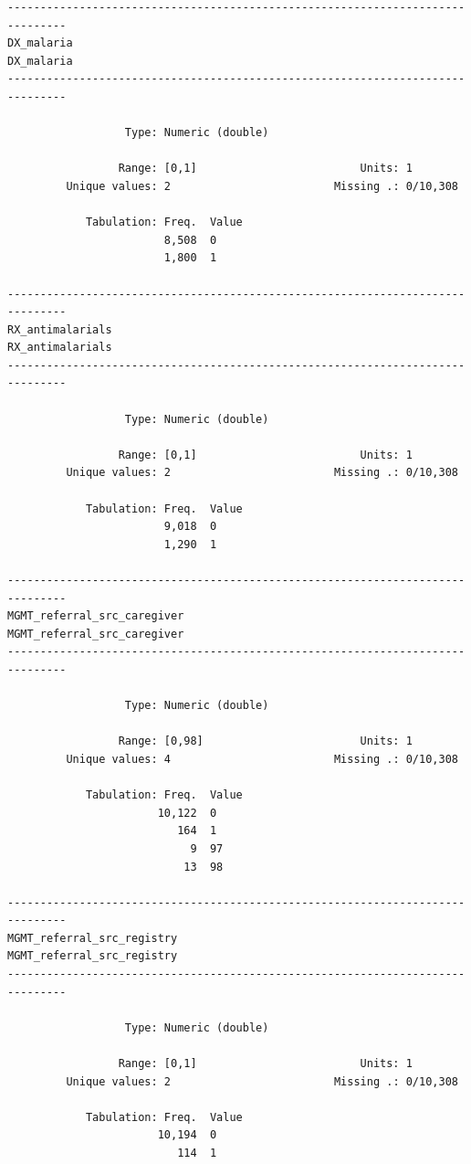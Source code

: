 \documentclass[
  letterpaper,
  DIV=11,
  numbers=noendperiod,
  oneside]{scrreprt}
\begin{document}
\begin{verbatim}
-------------------------------------------------------------------------------
DX_malaria                                                           DX_malaria
-------------------------------------------------------------------------------

                  Type: Numeric (double)

                 Range: [0,1]                         Units: 1
         Unique values: 2                         Missing .: 0/10,308

            Tabulation: Freq.  Value
                        8,508  0
                        1,800  1

-------------------------------------------------------------------------------
RX_antimalarials                                               RX_antimalarials
-------------------------------------------------------------------------------

                  Type: Numeric (double)

                 Range: [0,1]                         Units: 1
         Unique values: 2                         Missing .: 0/10,308

            Tabulation: Freq.  Value
                        9,018  0
                        1,290  1

-------------------------------------------------------------------------------
MGMT_referral_src_caregiver                         MGMT_referral_src_caregiver
-------------------------------------------------------------------------------

                  Type: Numeric (double)

                 Range: [0,98]                        Units: 1
         Unique values: 4                         Missing .: 0/10,308

            Tabulation: Freq.  Value
                       10,122  0
                          164  1
                            9  97
                           13  98

-------------------------------------------------------------------------------
MGMT_referral_src_registry                           MGMT_referral_src_registry
-------------------------------------------------------------------------------

                  Type: Numeric (double)

                 Range: [0,1]                         Units: 1
         Unique values: 2                         Missing .: 0/10,308

            Tabulation: Freq.  Value
                       10,194  0
                          114  1
\end{verbatim}
\end{document}
